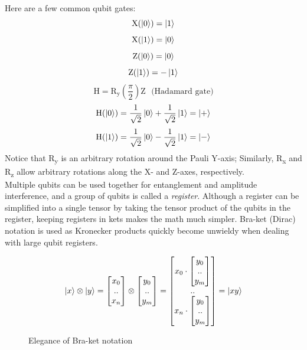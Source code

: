 \documentclass[12pt]{article}
\begin{document}
\noindent Here are a few common qubit gates:
$$ \text{X}(\ket{0}) = \ket{1} $$
$$ \text{X}(\ket{1}) = \ket{0} $$
$$ \text{Z}(\ket{0}) = \ket{0} $$
$$ \text{Z}(\ket{1}) = -\ket{1} $$
$$ \text{H} = \text{R}_{\text{y}} (\frac{\pi}{2}) \text{Z} \ \ \ \text{(Hadamard gate)}$$
$$ \text{H}(\ket{0}) = \frac{1}{\sqrt{2}} \ket{0} + \frac{1}{\sqrt{2}} \ket{1} = \ket{+} $$
$$ \text{H}(\ket{1}) = \frac{1}{\sqrt{2}} \ket{0} - \frac{1}{\sqrt{2}} \ket{1} = \ket{-} $$
Notice that R\textsubscript{y} is an arbitrary rotation around the Pauli Y-axis; Similarly, R\textsubscript{x} and R\textsubscript{z} allow arbitrary rotations along the X- and Z-axes, respectively.\\
Multiple qubits can be used together for entanglement and amplitude interference, and a group of qubits is called a \textit{register}. Although a register can be simplified into a single tensor by taking the tensor product of the qubits in the register, keeping registers in kets makes the math much simpler. Bra-ket (Dirac) notation is used as Kronecker products quickly become unwieldy when dealing with large qubit registers.

\begin{figure}[h]
    \centering
    $$ \ket{x} \otimes \ket{y} = \begin{bmatrix} x_0 \\ .. \\ x_n \end{bmatrix} \otimes \begin{bmatrix} y_0 \\ .. \\ y_m \end{bmatrix} = \begin{bmatrix} x_0 \cdot \begin{bmatrix} y_0 \\ .. \\ y_m \end{bmatrix} \\ .. \\ x_n \cdot \begin{bmatrix} y_0 \\ .. \\ y_m \end{bmatrix} \end{bmatrix} = \ket{xy} $$
    \caption{Elegance of Bra-ket notation}
    \label{fig:my_label}
\end{figure}
\end{document}
